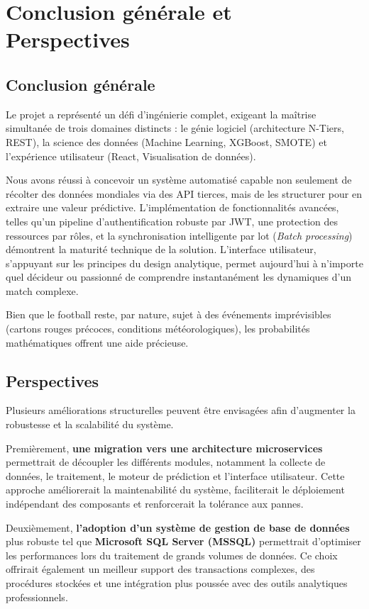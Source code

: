 \chapter*{Conclusion générale et Perspectives}
\section*{Conclusion générale}
Le projet a représenté un défi d'ingénierie complet, exigeant la maîtrise simultanée de trois domaines distincts : le génie logiciel (architecture N-Tiers, REST), la science des données (Machine Learning, XGBoost, SMOTE) et l'expérience utilisateur (React, Visualisation de données).

Nous avons réussi à concevoir un système automatisé capable non seulement de récolter des données mondiales via des API tierces, mais de les structurer pour en extraire une valeur prédictive. L'implémentation de fonctionnalités avancées, telles qu'un pipeline d'authentification robuste par JWT, une protection des ressources par rôles, et la synchronisation intelligente par lot (\textit{Batch processing}) démontrent la maturité technique de la solution. L'interface utilisateur, s'appuyant sur les principes du design analytique, permet aujourd'hui à n'importe quel décideur ou passionné de comprendre instantanément les dynamiques d'un match complexe.

Bien que le football reste, par nature, sujet à des événements imprévisibles (cartons rouges précoces, conditions météorologiques), les probabilités mathématiques offrent une aide précieuse.

\section*{Perspectives}
Plusieurs améliorations structurelles peuvent être envisagées afin d’augmenter la robustesse et la scalabilité du système.

Premièrement, \textbf{une migration vers une architecture microservices} permettrait de découpler les différents modules, notamment la collecte de données, le traitement, le moteur de prédiction et l’interface utilisateur. Cette approche améliorerait la maintenabilité du système, faciliterait le déploiement indépendant des composants et renforcerait la tolérance aux pannes.

        Deuxièmement, \textbf{l’adoption d’un système de gestion de base de données} plus robuste tel que \textbf{Microsoft SQL Server (MSSQL)} permettrait d’optimiser les performances lors du traitement de grands volumes de données. Ce choix offrirait également un meilleur support des transactions complexes, des procédures stockées et une intégration plus poussée avec des outils analytiques professionnels.


